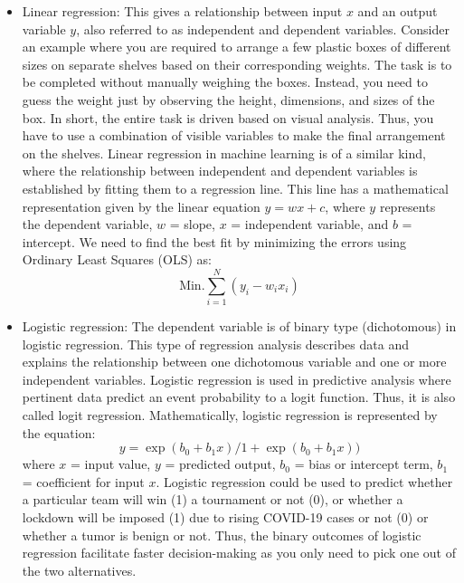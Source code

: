 \documentclass[11pt]{article}
\begin{document}
\begin{itemize}
\item Linear regression: This gives a relationship between input $x$ and an output variable $y$, also referred to as independent and dependent variables. 
Consider an example where you are required to arrange a few plastic boxes of different sizes on separate shelves based on their corresponding weights.
The task is to be completed without manually weighing the boxes. Instead, you need to guess the weight just by observing the height, dimensions, and sizes of the box. 
In short, the entire task is driven based on visual analysis. Thus, you have to use a combination of visible variables to make the 
final arrangement on the shelves. Linear regression in machine learning is of a similar kind, where the relationship between independent and dependent variables is established 
by fitting them to a regression line. This line has a mathematical representation given by the linear equation $y = wx + c$, where $y$ represents the dependent variable, 
$w$ = slope, $x$ = independent variable, and $b$ = intercept. We need to find the best fit by minimizing the errors using Ordinary Least Squares (OLS) as:
\begin{equation}
\text{Min.} \sum_{i=1}^{N} (y_{i} - w_{i} x_{i})
\end{equation}
\item Logistic regression: The dependent variable is of binary type (dichotomous) in logistic regression. This type of regression analysis describes data and explains the relationship between one dichotomous variable and one or more independent variables.
Logistic regression is used in predictive analysis where pertinent data predict an event probability to a logit function. Thus, it is also called logit regression.
Mathematically, logistic regression is represented by the equation:
\begin{equation}
y = \exp(b_{0} + b_{1}x)/1 + \exp(b_{0} + b_{1}x))
\end{equation}
where $x$ = input value, $y$ = predicted output, $b_0$ = bias or intercept term, $b_1$ = coefficient for input $x$.
Logistic regression could be used to predict whether a particular team will win (1) a tournament or not (0), 
or whether a lockdown will be imposed (1) due to rising COVID-19 cases or not (0) or whether a tumor is benign or not. 
Thus, the binary outcomes of logistic regression facilitate faster decision-making as you only need to pick one out of the two alternatives.

\end{itemize}
\end{document}
